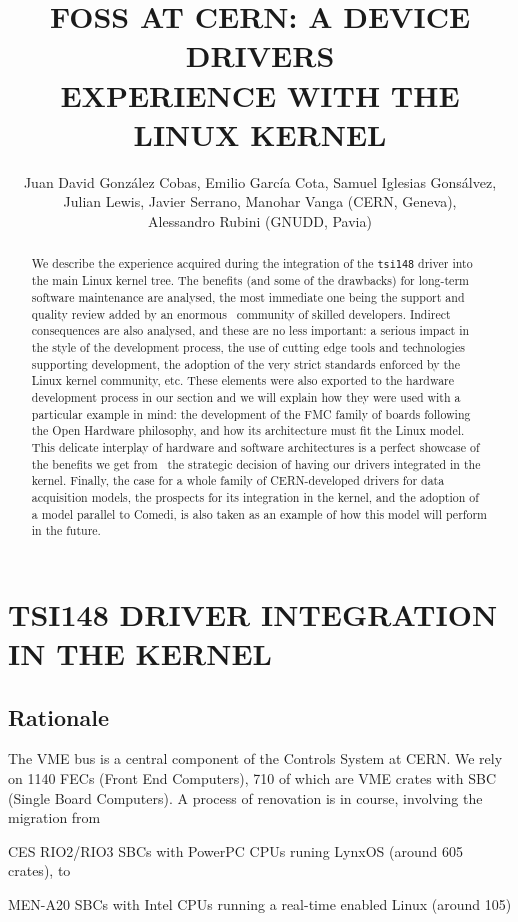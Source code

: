 \documentclass{JAC2003}
\title{FOSS AT CERN: A DEVICE DRIVERS\\
	EXPERIENCE WITH THE LINUX KERNEL}
\author{%
	Juan David Gonz\'alez Cobas, Emilio Garc\'ia Cota,
	Samuel Iglesias Gons\'alvez,\\
	Julian Lewis, Javier Serrano, Manohar Vanga (CERN, Geneva),\\ 
	Alessandro Rubini (GNUDD, Pavia)}
\begin{document}
\maketitle
\begin{abstract}
    We describe the experience acquired during the integration of the
    \texttt{tsi148} driver
    into the main Linux kernel tree. The benefits (and some of the drawbacks) for
    long-term software maintenance are analysed, the most immediate one being the
    support and quality review added by an enormous  community of skilled
    developers. Indirect consequences are also analysed, and these are no less
    important: a serious impact in the style of the development process, the use of
    cutting edge tools and technologies supporting development, the adoption of the
    very strict standards enforced by the Linux kernel community, etc. These
    elements were also exported to the hardware development process in our section
    and we will explain how they were used with a particular example in mind: the
    development of the FMC family of boards following the Open Hardware philosophy,
    and how its architecture must fit the Linux model. This delicate interplay of
    hardware and software architectures is a perfect showcase of the benefits we
    get from  the strategic decision of having our drivers integrated in the
    kernel.  Finally, the case for a whole family of CERN-developed drivers for
    data acquisition models, the prospects for its integration in the kernel, and
    the adoption of a model parallel to Comedi, is also taken as an example of how
    this model will perform in the future.
\end{abstract}


\section{TSI148 DRIVER INTEGRATION IN THE KERNEL}
\subsection{Rationale}
The VME bus is a central component of the Controls System at CERN. We 
rely on 1140 FECs (Front End Computers), 710 of which are VME crates
with SBC (Single Board Computers). A process of renovation is in course,
involving the migration from 
\begin{Itemize}
\item CES RIO2/RIO3 SBCs with PowerPC CPUs runing LynxOS (around 605 crates), to
\item MEN-A20 SBCs with Intel CPUs running  a real-time enabled Linux (around 105)
\end{Itemize}
\end{document}
